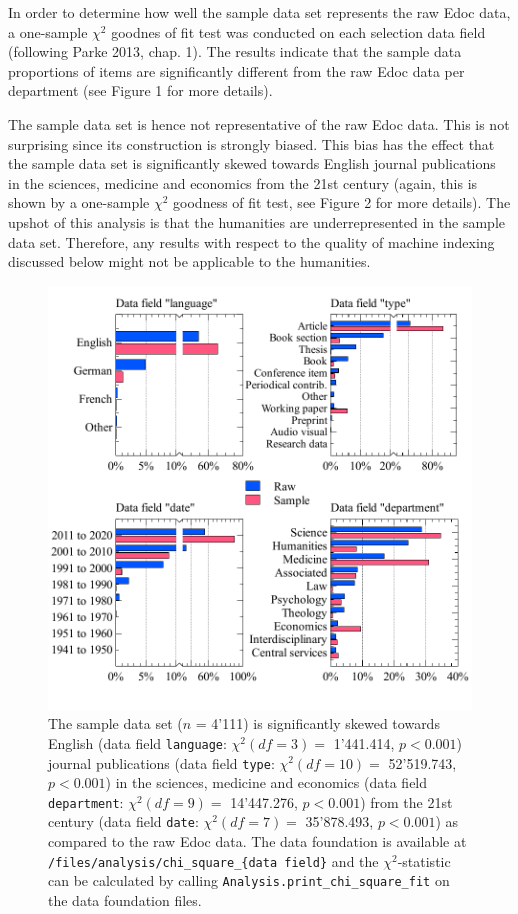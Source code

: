In order to determine how well the sample data set represents the raw
Edoc data, a one-sample \(\chi^2\) goodnes of fit test was conducted on
each selection data field (following Parke 2013, chap. 1). The results
indicate that the sample data proportions of items are significantly
different from the raw Edoc data per department (see Figure 1 for more
details).

The sample data set is hence not representative of the raw Edoc data.
This is not surprising since its construction is strongly biased. This
bias has the effect that the sample data set is significantly skewed
towards English journal publications in the sciences, medicine and
economics from the 21st century (again, this is shown by a one-sample
\(\chi^2\) goodness of fit test, see Figure 2 for more details). The
upshot of this analysis is that the humanities are underrepresented in
the sample data set. Therefore, any results with respect to the quality
of machine indexing discussed below might not be applicable to the
humanities.

\begin{figure}
\centering
\includegraphics{images/raw_sample_analysis.pdf}
\caption{The sample data set (\(n\) = 4'111) is significantly skewed
towards English (data field \texttt{language}: \(\chi^2 (df=3) =\)
1'441.414, \(p < 0.001\)) journal publications (data field
\texttt{type}: \(\chi^2 (df=10) =\) 52'519.743, \(p < 0.001\)) in the
sciences, medicine and economics (data field \texttt{department}:
\(\chi^2 (df=9) =\) 14'447.276, \(p < 0.001\)) from the 21st century
(data field \texttt{date}: \(\chi^2 (df=7) =\) 35'878.493,
\(p < 0.001\)) as compared to the raw Edoc data. The data foundation is
available at \texttt{/files/analysis/chi\_square\_\{data\ field\}} and
the \(\chi^2\)-statistic can be calculated by calling
\texttt{Analysis.print\_chi\_square\_fit} on the data foundation files.}
\end{figure}

